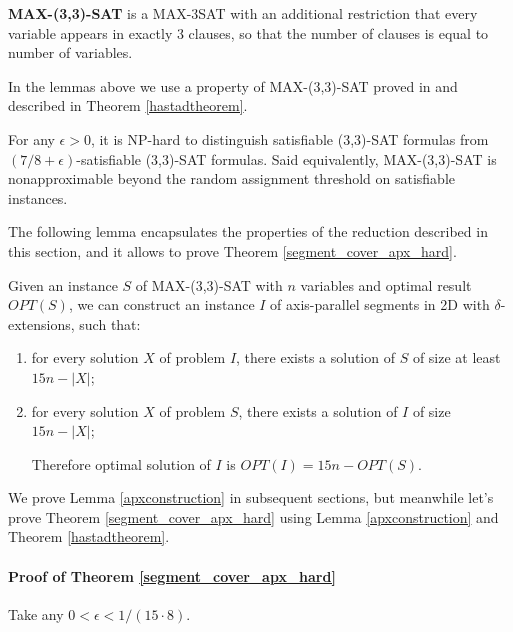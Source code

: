 \begin{defi}
\textbf{MAX-(3,3)-SAT} is a MAX-3SAT with an additional
restriction that every variable appears in exactly 3 clauses,
so that the number of clauses is equal to number of variables.
\end{defi}

In the lemmas above we use
a property of MAX-(3,3)-SAT proved in \cite{hastad} and described in
Theorem \ref{hastadtheorem}.

\begin{tw}{
	\label{hastadtheorem}
	\textbf{\cite{hastad}}
	
	For any $\epsilon > 0$, it is NP-hard to distinguish satisfiable
	(3,3)-SAT formulas from
	\linebreak\mbox{$(7/8 + \epsilon)$-satisfiable}
	(3,3)-SAT formulas. Said equivalently, MAX-(3,3)-SAT
	is nonapproximable beyond the random assignment threshold
	on satisfiable instances.
}\end{tw}

The following lemma encapsulates the properties
of the reduction described in this section,
and it allows to prove Theorem \ref{segment_cover_apx_hard}.

\begin{lemma}{
	\label{apxconstruction}
	Given an instance $S$ of  MAX-(3,3)-SAT 
	with $n$ variables and optimal result~$OPT(S)$,
	we can construct an instance $I$ of axis-parallel segments in 2D
	with $\delta$-extensions, such that:
	\begin{enumerate}
	\item for every solution $X$ of problem $I$,
	there exists a solution of $S$ of size at least  $15n - |X|$;
	
	\item for every solution $X$ of problem $S$,
	there exists a solution of $I$ of size $15n - |X|$;
	
	Therefore optimal solution of $I$ is $OPT(I) = 15n - OPT(S)$. 
	\end{enumerate}
	
}\end{lemma}

We prove Lemma \ref{apxconstruction} in
subsequent sections, but meanwhile let's prove
Theorem \ref{segment_cover_apx_hard} using Lemma \ref{apxconstruction}
and Theorem \ref{hastadtheorem}.

\paragraph{Proof of Theorem \ref{segment_cover_apx_hard}}
Take any $0 < \epsilon < 1/(15 \cdot 8)$.

